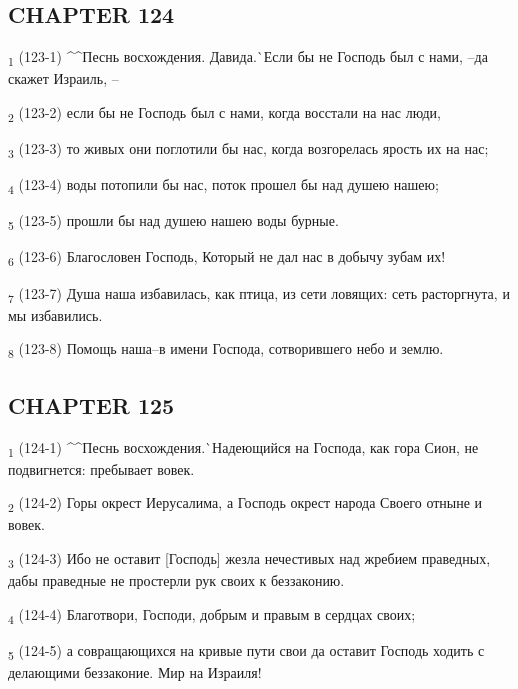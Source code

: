 \subsection{CHAPTER 124}
\begin{tcolorbox}
\textsubscript{1} (123-1) ^^Песнь восхождения. Давида.^^ Если бы не Господь был с нами, --да скажет Израиль, --
\end{tcolorbox}
\begin{tcolorbox}
\textsubscript{2} (123-2) если бы не Господь был с нами, когда восстали на нас люди,
\end{tcolorbox}
\begin{tcolorbox}
\textsubscript{3} (123-3) то живых они поглотили бы нас, когда возгорелась ярость их на нас;
\end{tcolorbox}
\begin{tcolorbox}
\textsubscript{4} (123-4) воды потопили бы нас, поток прошел бы над душею нашею;
\end{tcolorbox}
\begin{tcolorbox}
\textsubscript{5} (123-5) прошли бы над душею нашею воды бурные.
\end{tcolorbox}
\begin{tcolorbox}
\textsubscript{6} (123-6) Благословен Господь, Который не дал нас в добычу зубам их!
\end{tcolorbox}
\begin{tcolorbox}
\textsubscript{7} (123-7) Душа наша избавилась, как птица, из сети ловящих: сеть расторгнута, и мы избавились.
\end{tcolorbox}
\begin{tcolorbox}
\textsubscript{8} (123-8) Помощь наша--в имени Господа, сотворившего небо и землю.
\end{tcolorbox}
\subsection{CHAPTER 125}
\begin{tcolorbox}
\textsubscript{1} (124-1) ^^Песнь восхождения.^^ Надеющийся на Господа, как гора Сион, не подвигнется: пребывает вовек.
\end{tcolorbox}
\begin{tcolorbox}
\textsubscript{2} (124-2) Горы окрест Иерусалима, а Господь окрест народа Своего отныне и вовек.
\end{tcolorbox}
\begin{tcolorbox}
\textsubscript{3} (124-3) Ибо не оставит [Господь] жезла нечестивых над жребием праведных, дабы праведные не простерли рук своих к беззаконию.
\end{tcolorbox}
\begin{tcolorbox}
\textsubscript{4} (124-4) Благотвори, Господи, добрым и правым в сердцах своих;
\end{tcolorbox}
\begin{tcolorbox}
\textsubscript{5} (124-5) а совращающихся на кривые пути свои да оставит Господь ходить с делающими беззаконие. Мир на Израиля!
\end{tcolorbox}
